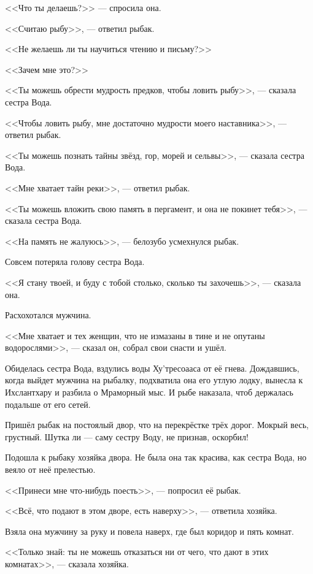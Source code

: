 <<Что ты делаешь?>> --- спросила она.

<<Считаю рыбу>>, --- ответил рыбак.

<<Не желаешь ли ты научиться чтению и письму?>>

<<Зачем мне это?>>

<<Ты можешь обрести мудрость предков, чтобы ловить рыбу>>, --- сказала сестра Вода.

<<Чтобы ловить рыбу, мне достаточно мудрости моего наставника>>, --- ответил рыбак.

<<Ты можешь познать тайны звёзд, гор, морей и сельвы>>, --- сказала сестра Вода.

<<Мне хватает тайн реки>>, --- ответил рыбак.

<<Ты можешь вложить свою память в пергамент, и она не покинет тебя>>, --- сказала сестра Вода.

<<На память не жалуюсь>>, --- белозубо усмехнулся рыбак.

Совсем потеряла голову сестра Вода.

<<Я стану твоей, и буду с тобой столько, сколько ты захочешь>>, --- сказала она.

Расхохотался мужчина.

<<Мне хватает и тех женщин, что не измазаны в тине и не опутаны водорослями>>, --- сказал он, собрал свои снасти и ушёл.

Обиделась сестра Вода, вздулись воды Ху'тресоааса от её гнева.
Дождавшись, когда выйдет мужчина на рыбалку, подхватила она его утлую лодку, вынесла к Ихслантхару и разбила о Мраморный мыс\FM.
И рыбе наказала, чтоб держалась подальше от его сетей.

Пришёл рыбак на постоялый двор, что на перекрёстке трёх дорог.
Мокрый весь, грустный.
Шутка ли --- саму сестру Воду, не признав, оскорбил!

Подошла к рыбаку хозяйка двора.
Не была она так красива, как сестра Вода, но веяло от неё прелестью.

<<Принеси мне что-нибудь поесть>>, --- попросил её рыбак.

<<Всё, что подают в этом дворе, есть наверху>>, --- ответила хозяйка.

Взяла она мужчину за руку и повела наверх, где был коридор и пять комнат.

<<Только знай: ты не можешь отказаться ни от чего, что дают в этих комнатах>>, --- сказала хозяйка.

